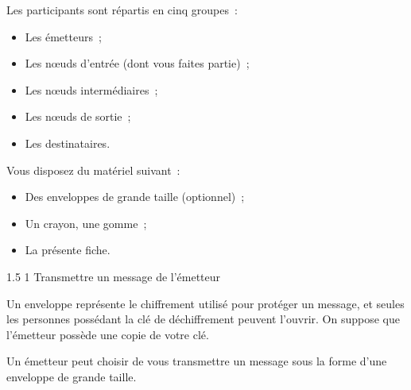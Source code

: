 \documentclass[a4paper,twoside,french]{article}
\makeatletter
\renewcommand\section{\@startsection
  {section}{1}{1cm}%
  {1.5\baselineskip}%
  {1\baselineskip}%
  {\normalfont\Large\bfseries}}%
\makeatother
\begin{document}
  \begin{multicols}{2}
    Les participants sont répartis en cinq groupes~:
    \begin{itemize}
    \item Les émetteurs~;
    \item Les n\oe uds d'entrée (dont vous faites partie)~;
    \item Les n\oe uds intermédiaires~;
    \item Les n\oe uds de sortie~;
    \item Les destinataires.
    \end{itemize}
    \vfill\columnbreak

    Vous disposez du matériel suivant~:
    \begin{itemize}
    \item Des enveloppes de grande taille (optionnel)~;
    \item Un crayon, une gomme~;
    \item La présente fiche.
    \end{itemize}
  \end{multicols}

  \section{Transmettre un message de l'émetteur}

  Un enveloppe représente le chiffrement utilisé pour protéger un
  message, et seules les personnes possédant la clé de déchiffrement
  peuvent l'ouvrir. On suppose que l'émetteur possède une copie de
  votre clé.

  Un émetteur peut choisir de vous transmettre un message sous la
  forme d'une enveloppe de grande taille.
\end{document}
